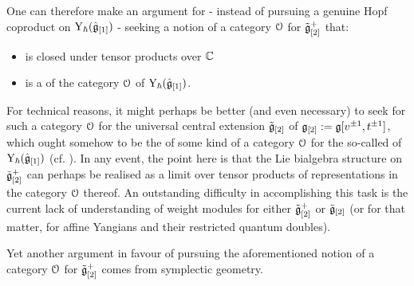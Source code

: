             One can therefore make an argument for - instead of pursuing a genuine Hopf coproduct on $\mathrm{Y}_{\hbar}(\hat{\mathfrak{g}}_{[1]})$ - seeking a notion of a category $\mathcal{O}$ for $\tilde{\mathfrak{g}}_{[2]}^+$ that:
            \begin{itemize}
                \item is closed under tensor products over $\mathbb{C}$
                \item is a  of the category $\mathcal{O}$ of $\mathrm{Y}_{\hbar}(\hat{\mathfrak{g}}_{[1]})$.
            \end{itemize}
            For technical reasons, it might perhaps be better (and even necessary) to seek for such a category $\mathcal{O}$ for the universal central extension $\tilde{\mathfrak{g}}_{[2]}$ of $\mathfrak{g}_{[2]} := \mathfrak{g}[v^{\pm 1}, t^{\pm 1}]$, which ought somehow to be the  of some kind of a category $\mathcal{O}$ for the so-called  of $\mathrm{Y}_{\hbar}(\hat{\mathfrak{g}}_{[1]})$ (cf. \cite{wendlandt_restricted_quantum_doubles_of_yangians}). In any event, the point here is that the Lie bialgebra structure on $\tilde{\mathfrak{g}}_{[2]}^+$ can perhaps be realised as a limit over tensor products of representations in the category $\mathcal{O}$ thereof. An outstanding difficulty in accomplishing this task is the current lack of understanding of weight modules for either $\tilde{\mathfrak{g}}_{[2]}^+$ or $\tilde{\mathfrak{g}}_{[2]}$ (or for that matter, for affine Yangians and their restricted quantum doubles).

            Yet another argument in favour of pursuing the aforementioned notion of a category $\mathcal{O}$ for $\tilde{\mathfrak{g}}_{[2]}^+$ comes from symplectic geometry. 

    

    

    
    \begin{appendices}
        
    \end{appendices}
            
    \printbibliography

